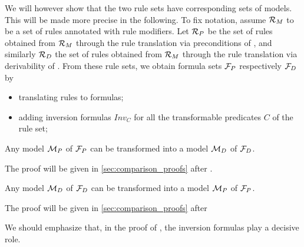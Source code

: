 We will however show that the two rule sets have corresponding sets of
models. This will be made more precise in the following. To fix notation,
assume ${\cal R}_M$ to be a set of rules annotated with rule modifiers. Let
${\cal R}_P$ be the set of rules obtained from ${\cal R}_M$ through the rule
translation via preconditions of , and similarly
${\cal R}_D$ the set of rules obtained from ${\cal R}_M$ through the rule
translation via derivability of . From these rule
sets, we obtain formula sets ${\cal F}_P$ respectively ${\cal F}_D$ by
\begin{itemize}
\item translating rules to formulas;
\item adding inversion formulas $Inv_C$ for all
  the transformable predicates $C$ of the rule set;
\end{itemize}


\begin{proposition}\label{lemma:mp_to_md}
  Any model ${\cal M}_P$ of ${\cal F}_P$ can be transformed into a model
  ${\cal M}_D$ of ${\cal F}_D$.
\end{proposition}

The proof will be given in \ref{sec:comparison_proofs} after  .


\begin{proposition}\label{lemma:md_to_mp}
  Any model ${\cal M}_D$ of ${\cal F}_D$ can be transformed into a model
  ${\cal M}_P$ of ${\cal F}_P$.
\end{proposition}

The proof will be given in \ref{sec:comparison_proofs} after

We should emphasize that, in the proof of , the
inversion formulas play a decisive role.


